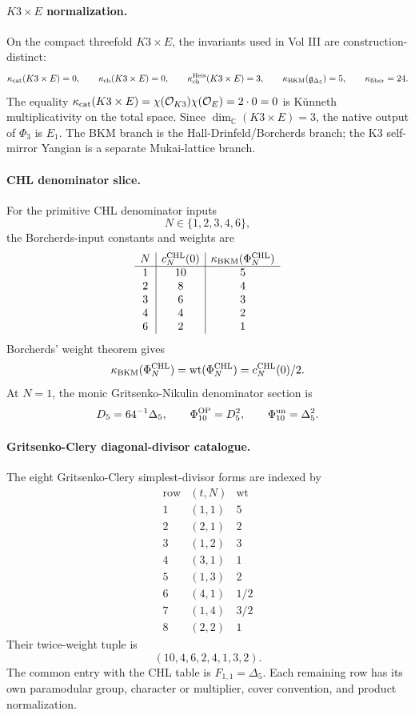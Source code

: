 \paragraph{\(K3\times E\) normalization.}
On the compact threefold \(K3\times E\), the invariants used in Vol III
are construction-distinct:
\[
  \kappa_{\mathrm{cat}}(K3\times E)=0,\qquad
  \kappa_{\mathrm{ch}}(K3\times E)=0,\qquad
  \kappa_{\mathrm{ch}}^{\mathrm{Heis}}(K3\times E)=3,\qquad
  \kappa_{\mathrm{BKM}}(\mathfrak g_{\Delta_5})=5,\qquad
  \kappa_{\mathrm{fiber}}=24.
\]
The equality \(\kappa_{\mathrm{cat}}(K3\times E)=\chi(\mathcal O_{K3})\chi(\mathcal
O_E)=2\cdot0=0\) is K\"unneth multiplicativity on the total space.  Since
\(\dim_{\mathbb C}(K3\times E)=3\), the native output of \(\Phi_3\) is
\(E_1\).  The BKM branch is the Hall-Drinfeld/Borcherds branch; the K3
self-mirror Yangian is a separate Mukai-lattice branch.

\paragraph{CHL denominator slice.}
For the primitive CHL denominator inputs
\[
  N\in\{1,2,3,4,6\},
\]
the Borcherds-input constants and weights are
\[
\begin{array}{c|c|c}
N & c_N^{\mathrm{CHL}}(0) & \kappa_{\mathrm{BKM}}(\Phi_N^{\mathrm{CHL}})\\
\hline
1 & 10 & 5\\
2 & 8 & 4\\
3 & 6 & 3\\
4 & 4 & 2\\
6 & 2 & 1
\end{array}
\]
Borcherds' weight theorem gives
\[
  \kappa_{\mathrm{BKM}}(\Phi_N^{\mathrm{CHL}})
  =
  \operatorname{wt}(\Phi_N^{\mathrm{CHL}})
  =
  c_N^{\mathrm{CHL}}(0)/2.
\]
At \(N=1\), the monic Gritsenko-Nikulin denominator section is
\[
  D_5=64^{-1}\Delta_5,
  \qquad
  \Phi_{10}^{\mathrm{OP}}=D_5^2,\qquad
  \Phi_{10}^{\mathrm{un}}=\Delta_5^2.
\]

\paragraph{Gritsenko-Clery diagonal-divisor catalogue.}
The eight Gritsenko-Clery simplest-divisor forms are indexed by
\[
\begin{array}{c|c|c}
\text{row} & (t,N) & \operatorname{wt}\\
\hline
1 & (1,1) & 5\\
2 & (2,1) & 2\\
3 & (1,2) & 3\\
4 & (3,1) & 1\\
5 & (1,3) & 2\\
6 & (4,1) & 1/2\\
7 & (1,4) & 3/2\\
8 & (2,2) & 1
\end{array}
\]
Their twice-weight tuple is
\[
  (10,4,6,2,4,1,3,2).
\]
The common entry with the CHL table is \(F_{1,1}=\Delta_5\).  Each
remaining row has its own paramodular group, character or multiplier,
cover convention, and product normalization.

